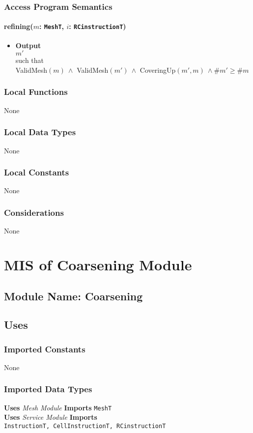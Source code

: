 \documentclass[12pt,titlepage]{article}
\begin{document}
\subsubsection{Access Program Semantics}
\paragraph{refining($m$: {\tt MeshT}, $i$: {\tt RCinstructionT})}
\begin{itemize}
\item \textbf{Output}\\ 
$m'$ \\such that\\
ValidMesh$(m)\ \wedge$ ValidMesh$(m')\ \wedge$ CoveringUp$(m', m)\ \wedge \# m' \geq \#m$
\end{itemize}

\subsubsection{Local Functions} None
\subsubsection{Local Data Types} None
\subsubsection{Local Constants} None
\subsubsection{Considerations} None


\section{MIS of Coarsening Module \label{AmisSecCoa}}

\subsection{Module Name: Coarsening}

\subsection{Uses}
\subsubsection{Imported Constants} None
\subsubsection{Imported Data Types} 
{\bf Uses}  \emph{Mesh Module}  {\bf Imports}  \texttt{MeshT} \\
{\bf Uses}  \emph{Service Module}  {\bf Imports} \\
\texttt{InstructionT, CellInstructionT, RCinstructionT}
\end{document}
